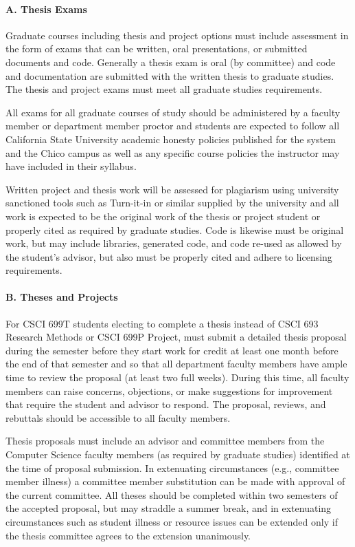 \documentclass{scrartcl}
\begin{document}
\paragraph{A. Thesis Exams}


Graduate courses including thesis and project options must include assessment in the form of exams that can be written, oral presentations, or submitted documents and code. Generally a thesis exam is oral (by committee) and code and documentation are submitted with the written thesis to graduate studies. The thesis and project exams must meet all graduate studies requirements.

All exams for all graduate courses of study should be administered by a faculty member or department member proctor and students are expected to follow all California State University academic honesty policies published for the system and the Chico campus as well as any specific course policies the instructor may have included in their syllabus.

Written project and thesis work will be assessed for plagiarism using university sanctioned tools such as Turn-it-in or similar supplied by the university and all work is expected to be the original work of the thesis or project student or properly cited as required by graduate studies.  Code is likewise must be original work, but may include libraries, generated code, and code re-used as allowed by the student’s advisor, but also must be properly cited and adhere to licensing requirements.

\paragraph{B. Theses and Projects}


For CSCI 699T students electing to complete a thesis instead of CSCI 693 Research Methods or CSCI 699P Project, must submit a detailed thesis proposal during the semester before they start work for credit at least one month before the end of that semester and so that all department faculty members have ample time to review the proposal (at least two full weeks). During this time, all faculty members can raise concerns, objections, or make suggestions for improvement that require the student and advisor to respond.  The proposal, reviews, and rebuttals should be accessible to all faculty members.

Thesis proposals must include an advisor and committee members from the Computer Science faculty members (as required by graduate studies) identified at the time of proposal submission. In extenuating circumstances (e.g., committee member illness) a committee member substitution can be made with approval of the current committee. All theses should be completed within two semesters of the accepted proposal, but may straddle a summer break, and in extenuating circumstances such as student illness or resource issues can be extended only if the thesis committee agrees to the extension unanimously.
\end{document}

